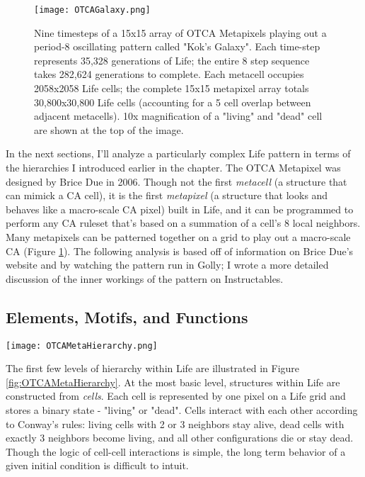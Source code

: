 {\begin{figure}
  \texttt{[image: OTCAGalaxy.png]}
  \caption{Nine timesteps of a 15x15 array of OTCA Metapixels playing out a period-8 oscillating pattern called "Kok's Galaxy".  Each time-step represents 35,328 generations of Life; the entire 8 step sequence takes 282,624 generations to complete.  Each metacell occupies 2058x2058 Life cells; the complete 15x15 metapixel array totals 30,800x30,800 Life cells (accounting for a 5 cell overlap between adjacent metacells).  10x magnification of a "living" and "dead" cell are shown at the top of the image.}
  \label{fig:OTCAGalaxy}
\end{figure}

In the next sections, I'll analyze a particularly complex Life pattern in terms of the hierarchies I introduced earlier in the chapter.  The OTCA Metapixel was designed by Brice Due in 2006.  Though not the first \textit{metacell} (a structure that can mimick a CA cell), it is the first \textit{metapixel} (a structure that looks and behaves like a macro-scale CA pixel) built in Life, and it can be programmed to perform any CA ruleset that's based on a summation of a cell's 8 local neighbors.  Many metapixels can be patterned together on a grid to play out a macro-scale CA (Figure \ref{fig:OTCAGalaxy}).  The following analysis is based off of information on Brice Due's website\cite{Due2006} and by watching the pattern run in Golly; I wrote a more detailed discussion of the inner workings of the pattern on Instructables\cite{Ghassaei2015}.

\subsection{Elements, Motifs, and Functions}

\begin{sidewaysfigure}
  \texttt{[image: OTCAMetaHierarchy.png]}
  \caption{Hierarchical breakdown of OTCA Metapixel into modules, functions, motifs, and elements.  Complex-level diagram is shown in Figure \ref{fig:OTCADiagram}.}
  \label{fig:OTCAMetaHierarchy}
\end{sidewaysfigure}

The first few levels of hierarchy within Life are illustrated in Figure \ref{fig:OTCAMetaHierarchy}.  At the most basic level, structures within Life are constructed from \textit{cells}.  Each cell is represented by one pixel on a Life grid and stores a binary state - "living" or "dead".  Cells interact with each other according to Conway's rules: living cells with 2 or 3 neighbors stay alive, dead cells with exactly 3 neighbors become living, and all other configurations die or stay dead.  Though the logic of cell-cell interactions is simple, the long term behavior of a given initial condition is difficult to intuit. \\

}
